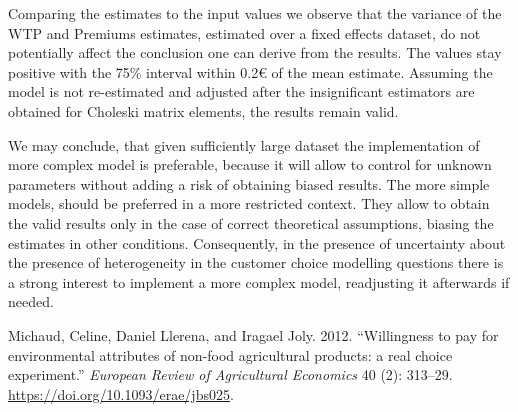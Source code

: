 \documentclass[11pt,]{article}
\begin{document}
Comparing the estimates to the input values we observe that the variance
of the WTP and Premiums estimates, estimated over a fixed effects
dataset, do not potentially affect the conclusion one can derive from
the results. The values stay positive with the 75\% interval within 0.2€
of the mean estimate. Assuming the model is not re-estimated and
adjusted after the insignificant estimators are obtained for Choleski
matrix elements, the results remain valid.

We may conclude, that given sufficiently large dataset the
implementation of more complex model is preferable, because it will
allow to control for unknown parameters without adding a risk of
obtaining biased results. The more simple models, should be preferred in
a more restricted context. They allow to obtain the valid results only
in the case of correct theoretical assumptions, biasing the estimates in
other conditions. Consequently, in the presence of uncertainty about the
presence of heterogeneity in the customer choice modelling questions
there is a strong interest to implement a more complex model,
readjusting it afterwards if needed.

\FloatBarrier

\hypertarget{refs}{}
\leavevmode\hypertarget{ref-llerena2013rose}{}%
Michaud, Celine, Daniel Llerena, and Iragael Joly. 2012. ``Willingness
to pay for environmental attributes of non-food agricultural products: a
real choice experiment.'' \emph{European Review of Agricultural
Economics} 40 (2): 313--29. \url{https://doi.org/10.1093/erae/jbs025}.
\end{document}
